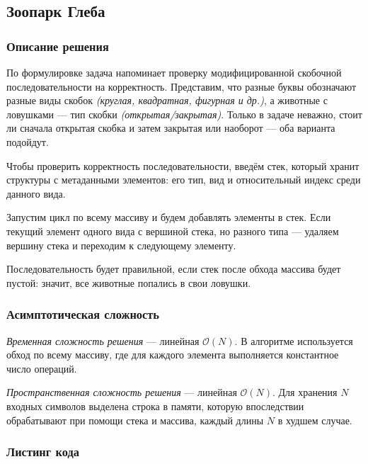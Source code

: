 \subsection{Зоопарк Глеба}

\subsubsection{Описание решения}

По формулировке задача напоминает проверку модифицированной скобочной последовательности на корректность. Представим, что разные буквы обозначают разные виды скобок \textit{(круглая, квадратная, фигурная и др.)}, а животные с ловушками --- тип скобки \textit{(открытая/закрытая)}. Только в задаче неважно, стоит ли сначала открытая скобка и затем закрытая или наоборот --- оба варианта подойдут.

Чтобы проверить корректность последовательности, введём стек, который хранит структуры с метаданными элементов: его тип, вид и относительный индекс среди данного вида.

Запустим цикл по всему массиву и будем добавлять элементы в стек. Если текущий элемент одного вида с вершиной стека, но разного типа --- удаляем вершину стека и переходим к следующему элементу.

Последовательность будет правильной, если стек после обхода массива будет пустой: значит, все животные попались в свои ловушки.

\subsubsection{Асимптотическая сложность}

\textit{Временная сложность решения} --- линейная \( \mathcal{O}(N) \). В алгоритме используется обход по всему массиву, где для каждого элемента выполняется константное число операций.

\textit{Пространственная сложность решения} --- линейная \( \mathcal{O}(N) \). Для хранения \( N \) входных символов выделена строка в памяти, которую впоследствии обрабатывают при помощи стека и массива, каждый длины \( N \) в худшем случае. 

\subsubsection{Листинг кода}

